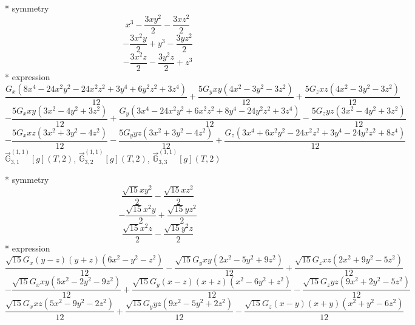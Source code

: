 \documentclass[fleqn,8pt]{jsarticle}
\begin{document}
\noindent\quad ** symmetry
\begin{dmath*}
x^{3} - \frac{3 x y^{2}}{2} - \frac{3 x z^{2}}{2}
\end{dmath*}
\begin{dmath*}
- \frac{3 x^{2} y}{2} + y^{3} - \frac{3 y z^{2}}{2}
\end{dmath*}
\begin{dmath*}
- \frac{3 x^{2} z}{2} - \frac{3 y^{2} z}{2} + z^{3}
\end{dmath*}
\noindent\quad ** expression
\begin{dmath*}
\frac{G_{x} \left(8 x^{4} - 24 x^{2} y^{2} - 24 x^{2} z^{2} + 3 y^{4} + 6 y^{2} z^{2} + 3 z^{4}\right)}{12} + \frac{5 G_{y} x y \left(4 x^{2} - 3 y^{2} - 3 z^{2}\right)}{12} + \frac{5 G_{z} x z \left(4 x^{2} - 3 y^{2} - 3 z^{2}\right)}{12}
\end{dmath*}
\begin{dmath*}
- \frac{5 G_{x} x y \left(3 x^{2} - 4 y^{2} + 3 z^{2}\right)}{12} + \frac{G_{y} \left(3 x^{4} - 24 x^{2} y^{2} + 6 x^{2} z^{2} + 8 y^{4} - 24 y^{2} z^{2} + 3 z^{4}\right)}{12} - \frac{5 G_{z} y z \left(3 x^{2} - 4 y^{2} + 3 z^{2}\right)}{12}
\end{dmath*}
\begin{dmath*}
- \frac{5 G_{x} x z \left(3 x^{2} + 3 y^{2} - 4 z^{2}\right)}{12} - \frac{5 G_{y} y z \left(3 x^{2} + 3 y^{2} - 4 z^{2}\right)}{12} + \frac{G_{z} \left(3 x^{4} + 6 x^{2} y^{2} - 24 x^{2} z^{2} + 3 y^{4} - 24 y^{2} z^{2} + 8 z^{4}\right)}{12}
\end{dmath*}
\noindent\quad $\vec{\mathbb{G}}_{3,1}^{(1,1)}[g](T,2)$, $\vec{\mathbb{G}}_{3,2}^{(1,1)}[g](T,2)$, $\vec{\mathbb{G}}_{3,3}^{(1,1)}[g](T,2)$

\noindent\quad ** symmetry
\begin{dmath*}
\frac{\sqrt{15} x y^{2}}{2} - \frac{\sqrt{15} x z^{2}}{2}
\end{dmath*}
\begin{dmath*}
- \frac{\sqrt{15} x^{2} y}{2} + \frac{\sqrt{15} y z^{2}}{2}
\end{dmath*}
\begin{dmath*}
\frac{\sqrt{15} x^{2} z}{2} - \frac{\sqrt{15} y^{2} z}{2}
\end{dmath*}
\noindent\quad ** expression
\begin{dmath*}
\frac{\sqrt{15} G_{x} \left(y - z\right) \left(y + z\right) \left(6 x^{2} - y^{2} - z^{2}\right)}{12} - \frac{\sqrt{15} G_{y} x y \left(2 x^{2} - 5 y^{2} + 9 z^{2}\right)}{12} + \frac{\sqrt{15} G_{z} x z \left(2 x^{2} + 9 y^{2} - 5 z^{2}\right)}{12}
\end{dmath*}
\begin{dmath*}
- \frac{\sqrt{15} G_{x} x y \left(5 x^{2} - 2 y^{2} - 9 z^{2}\right)}{12} + \frac{\sqrt{15} G_{y} \left(x - z\right) \left(x + z\right) \left(x^{2} - 6 y^{2} + z^{2}\right)}{12} - \frac{\sqrt{15} G_{z} y z \left(9 x^{2} + 2 y^{2} - 5 z^{2}\right)}{12}
\end{dmath*}
\begin{dmath*}
\frac{\sqrt{15} G_{x} x z \left(5 x^{2} - 9 y^{2} - 2 z^{2}\right)}{12} + \frac{\sqrt{15} G_{y} y z \left(9 x^{2} - 5 y^{2} + 2 z^{2}\right)}{12} - \frac{\sqrt{15} G_{z} \left(x - y\right) \left(x + y\right) \left(x^{2} + y^{2} - 6 z^{2}\right)}{12}
\end{dmath*}
\end{document}
